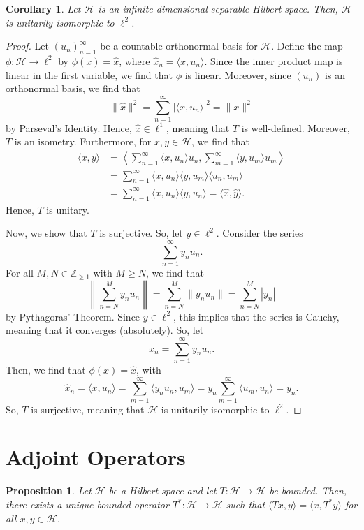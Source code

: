 \documentclass[a4paper, openany]{memoir}
\theoremstyle{definition}
\theoremstyle{plain}
\newtheorem{proposition}[definition]{Proposition}
\newtheorem{corollary}[definition]{Corollary}
\begin{document}
    \begin{corollary}
        Let $\mathcal{H}$ is an infinite-dimensional separable Hilbert space. Then, $\mathcal{H}$ is unitarily isomorphic to $\ell^2$.
    \end{corollary}
    \begin{proof}
        Let $(u_n)_{n=1}^\infty$ be a countable orthonormal basis for $\mathcal{H}$. Define the map $\phi \colon \mathcal{H} \to \ell^2$ by $\phi(x) = \hat{x}$, where $\hat{x}_n = \langle x, u_n\rangle$. Since the inner product map is linear in the first variable, we find that $\phi$ is linear. Moreover, since $(u_n)$ is an orthonormal basis, we find that
        \[\lVert \hat{x} \rVert^2 = \sum_{n=1}^\infty |\langle x, u_n \rangle|^2 = \lVert x \rVert^2\]
        by Parseval's Identity. Hence, $\hat{x} \in \ell^1$, meaning that $T$ is well-defined. Moreover, $T$ is an isometry. Furthermore, for $x, y \in \mathcal{H}$, we find that
        \begin{align*}
            \langle x, y \rangle &= \left\langle \sum_{n=1}^\infty \langle x, u_n \rangle u_n, \sum_{m=1}^\infty \langle y, u_m \rangle u_m \right\rangle \\
            &= \sum_{n=1}^\infty \langle x, u_n \rangle \langle y, u_m \rangle \langle u_n, u_m \rangle \\
            &= \sum_{n=1}^\infty \langle x, u_n \rangle \langle y, u_n \rangle = \langle \hat{x}, \hat{y} \rangle.
        \end{align*}
        Hence, $T$ is unitary.

        Now, we show that $T$ is surjective. So, let $y \in \ell^2$. Consider the series
        \[\sum_{n=1}^\infty y_n u_n.\]
        For all $M, N \in \mathbb{Z}_{\geq 1}$ with $M \geq N$, we find that
        \[\left\lVert \sum_{n=N}^M y_n u_n \right\rVert = \sum_{n=N}^M \lVert y_n u_n \rVert = \sum_{n=N}^M |y_n|\]
        by Pythagoras' Theorem. Since $y \in \ell^2$, this implies that the series is Cauchy, meaning that it converges (absolutely). So, let
        \[x_n = \sum_{n=1}^\infty y_n u_n.\]
        Then, we find that $\phi(x) = \hat{x}$, with
        \[\hat{x}_n = \langle x, u_n \rangle = \sum_{m=1}^\infty \langle y_n u_n, u_m \rangle = y_n \sum_{m=1}^\infty \langle u_m , u_n \rangle = y_n.\]
        So, $T$ is surjective, meaning that $\mathcal{H}$ is unitarily isomorphic to $\ell^2$.
    \end{proof}
    \newpage

    \section{Adjoint Operators}
    \begin{proposition}
        Let $\mathcal{H}$ be a Hilbert space and let $T \colon \mathcal{H} \to \mathcal{H}$ be bounded. Then, there exists a unique bounded operator $T^* \colon \mathcal{H} \to \mathcal{H}$ such that $\langle Tx, y \rangle = \langle x, T^*y \rangle$ for all $x, y \in \mathcal{H}$.
    \end{proposition}
        
\end{document}
